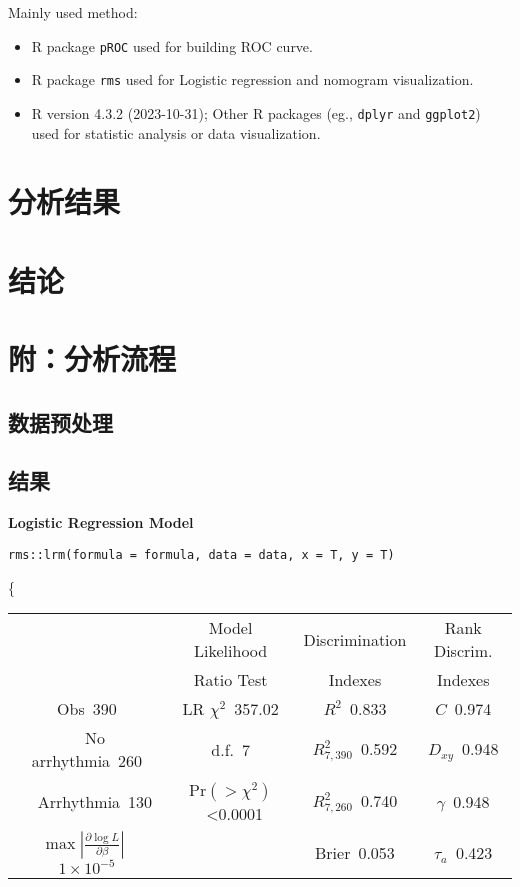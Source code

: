 \documentclass[
]{article}
\providecommand{\tightlist}{%
  \setlength{\itemsep}{0pt}\setlength{\parskip}{0pt}}
\begin{document}
Mainly used method:

\begin{itemize}
\tightlist
\item
  R package \texttt{pROC} used for building ROC curve.
\item
  R package \texttt{rms} used for Logistic regression and nomogram visualization.
\item
  R version 4.3.2 (2023-10-31); Other R packages (eg., \texttt{dplyr} and \texttt{ggplot2}) used for statistic analysis or data visualization.
\end{itemize}

\hypertarget{results}{%
\section{分析结果}\label{results}}

\hypertarget{dis}{%
\section{结论}\label{dis}}

\hypertarget{workflow}{%
\section{附：分析流程}\label{workflow}}

\hypertarget{ux6570ux636eux9884ux5904ux7406}{%
\subsection{数据预处理}\label{ux6570ux636eux9884ux5904ux7406}}

\hypertarget{ux7ed3ux679c}{%
\subsection{结果}\label{ux7ed3ux679c}}

\noindent \textbf{Logistic Regression Model}

\begin{verbatim}
rms::lrm(formula = formula, data = data, x = T, y = T)
\end{verbatim}

\{\selectfont 

\begin{center}\begin{tabular}{|c|c|c|c|}\hline
&Model Likelihood&Discrimination&Rank Discrim.\\
&Ratio Test&Indexes&Indexes\\\hline
Obs~\hfill 390&LR $\chi^{2}$~\hfill 357.02&$R^{2}$~\hfill 0.833&$C$~\hfill 0.974\\
~~No arrhythmia~\hfill 260&d.f.~\hfill 7&$R^{2}_{7,390}$~\hfill 0.592&$D_{xy}$~\hfill 0.948\\
~~Arrhythmia~\hfill 130&Pr$(>\chi^{2})$~\hfill \textless 0.0001&$R^{2}_{7,260}$~\hfill 0.740&$\gamma$~\hfill 0.948\\
$\max|\frac{\partial\log L}{\partial \beta}|$~\hfill $1\!\times\!10^{-5}$&&Brier~\hfill 0.053&$\tau_{a}$~\hfill 0.423\\
\hline
\end{tabular}
\end{center}
\end{document}
